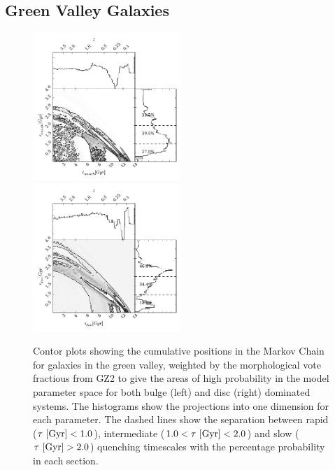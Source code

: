 \documentclass[useAMS,usenatbib]{mn2e}
\def\changed    {\color{titlecol} }
\begin{document}
\subsection{Green Valley Galaxies}\label{gv}

\begin{figure}
\includegraphics[width=0.4975\textwidth]{green_smooth.pdf}
\includegraphics[width=0.4975\textwidth]{green_disc.pdf}
\caption[8pt]{{\changed Contor plots showing the cumulative positions in the Markov Chain for galaxies in the green valley, weighted by the morphological vote fractious from GZ2 to give the areas of high probability in the model parameter space for both bulge (left) and disc (right) dominated systems. The histograms show the projections into one dimension for each parameter. The dashed lines show the separation between rapid ($\tau ~\rm{[Gyr]} < 1.0$), intermediate ($1.0 < \tau ~\rm{[Gyr]} < 2.0$) and slow ($\tau ~\rm{[Gyr]} > 2.0$) quenching timescales with the percentage probability in each section.}}
\label{green_v}
\end{figure}
\end{document}
